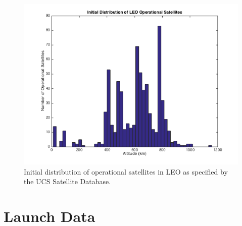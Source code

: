 \documentclass[pre,12pt]{revtex4-1}
\begin{document}
\begin{figure}[h!]
	\includegraphics[width=.8\textwidth]{"Figures/initDistributionOfOperationalSatellites"}
	\caption{Initial distribution of operational satellites in LEO as specified by the UCS Satellite Database.}
	\label{fig:initDistOpSat}
\end{figure}

\clearpage
\section{Launch Data}\label{AppendixB}
\end{document}

